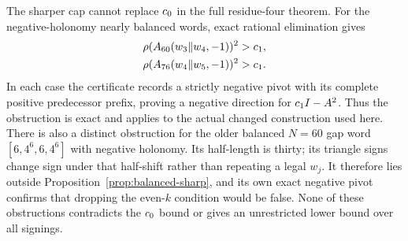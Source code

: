 The sharper cap cannot replace $c_0$ in the full residue-four theorem.
For the negative-holonomy nearly balanced words, exact rational elimination
gives
\begin{align*}
 \rho(A_{60}(w_3\|w_4,-1))^2&>c_1,\\
 \rho(A_{76}(w_4\|w_5,-1))^2&>c_1.
\end{align*}
In each case the certificate records a strictly negative pivot with its
complete positive predecessor prefix, proving a negative direction for
$c_1 I-A^2$. Thus the obstruction is exact and applies to the actual
changed construction used here.
There is also a distinct obstruction for the older balanced $N=60$ gap
word $[6,4^6,6,4^6]$ with negative holonomy. Its half-length is thirty;
its triangle signs change sign under that half-shift rather than repeating
a legal $w_j$. It therefore lies outside
Proposition~\ref{prop:balanced-sharp}, and its own exact negative pivot
confirms that dropping the even-$k$ condition would be false.
None of these obstructions contradicts the $c_0$ bound or gives an
unrestricted lower bound over all signings.
